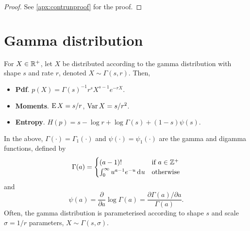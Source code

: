 \begin{proof}
  See \cref{apx:contrunproof} for the proof.
\end{proof}

%
%
\section{Gamma distribution}
\label{sec:gammadist}

For $X\in\mathbb{R}^+$, let $X$ be distributed according to the gamma distribution with shape $s$ and rate $r$, denoted $X\sim\Gamma(s,r)$. 
Then,
\begin{itemize}
  \item \textbf{Pdf}. $p(X) = \Gamma(s)^{-1} r^s X^{s-1} e^{-rX}$.
  \item \textbf{Moments}. $\operatorname{E} X=s/r$, $\operatorname{Var} X = s/r^2$.
  \item \textbf{Entropy}. $H(p)=s - \log r + \log \Gamma(s) + (1-s)\psi(s)$.
\end{itemize}
In the above, $\Gamma(\cdot) = \Gamma_1(\cdot)$ and $\psi(\cdot) = \psi_1(\cdot)$ are the gamma and digamma functions, defined by
\[
  \Gamma(a) = 
  \begin{cases}
    (a-1)! &\text{if } a \in \mathbb{Z}^+ \\
    \int_0^\infty u^{a-1} e^{-u} \operatorname{d}\hspace{0.5pt}\! u &\text{otherwise} \\
  \end{cases}
\]
and
\[
  \psi(a) = \frac{\partial}{\partial a}\log \Gamma(a) = \frac{\partial\Gamma(a)/\partial a}{\Gamma(a)}.
\]
Often, the gamma distribution is parameterised according to shape $s$ and scale $\sigma = 1/r$ parameters, $X\sim\Gamma(s,\sigma)$.

